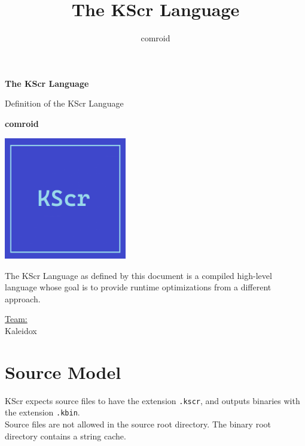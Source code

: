\documentclass{docs}
\begin{document}
    \title{The KScr Language}
    \author{comroid}
    \begin{titlepage}
        \begin{center}
            \vspace*{1cm}
            
            \Huge
            \textbf{The KScr Language}
            
            \vspace{0.5cm}
            \LARGE
            Definition of the KScr Language
            
            \vspace{1.5cm}
            
            \textbf{comroid}
            
            \vspace{0.8cm}
            
            \includegraphics[width=0.4\textwidth]{img/kscr-icon.png}
            
            \vfill
            
            The KScr Language as defined by this document is a compiled high-level language whose goal is to provide runtime optimizations from a different approach.
            
            \vspace{1.2cm}
            
            \Large
            \underline{Team:} \\
            Kaleidox
        \end{center}
    \end{titlepage}
    \tableofcontents
    
    \pagebreak
    \section{Source Model}
    KScr expects source files to have the extension \texttt{.kscr}, and outputs binaries with the extension \texttt{.kbin}.
    \\
    Source files are not allowed in the source root directory.
    The binary root directory contains a string cache.
    
\end{document}
